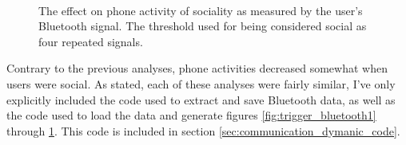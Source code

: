 \begin{figure} %
	\centering
	 \\
	\caption{The effect on phone activity of sociality as measured by the user's Bluetooth signal. The threshold used for being considered social as four repeated signals.}
	\label{fig:trigger_bluetooth4}
\end{figure}
Contrary to the previous analyses, phone activities decreased somewhat when users were social. As stated, each of these analyses were fairly similar, I've only explicitly included the code used to extract and save Bluetooth data, as well as the code used to load the data and generate figures \ref{fig:trigger_bluetooth1} through \ref{fig:trigger_bluetooth4}. This code is included in section \ref{sec:communication_dymanic_code}.
